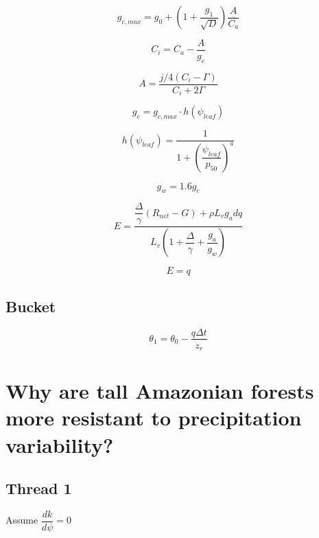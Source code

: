 \documentclass[11pt]{article}
\begin{document}
\begin{equation}
g_{c,max} = g_0 + \left(1+\dfrac{g_1}{\sqrt{D}}\right)\dfrac{A}{C_a}
\end{equation}

\begin{equation}
C_i = C_a - \dfrac{A}{g_c}
\end{equation}

\begin{equation}
A = \dfrac{j/4\left(C_i-\Gamma\right)}{C_i+2\Gamma}
\end{equation}

\begin{equation}
g_c = g_{c,max}\cdot h\left(\psi_{leaf}\right)
\end{equation}

\begin{equation}
h\left(\psi_{leaf}\right) = 
\dfrac{1}{
1+\left(\dfrac{\psi_{leaf}}{p_{50}}\right)^a
}
\end{equation}


\begin{equation}
g_w = 1.6g_c
\end{equation}

\begin{equation}
E = \dfrac{\dfrac{\Delta}{\gamma}\left(R_{net}-G\right)+\rho L_v g_a dq}
{L_v\left(1+\dfrac{\Delta}{\gamma}+\dfrac{g_a}{g_w}\right)}
\end{equation}

\begin{equation}
E = q
\end{equation}

\subsection{Bucket}

\begin{equation}
\theta_1 = \theta_0 - \dfrac{q\Delta t}{z_r}
\end{equation}


\newpage
\section{Why are tall Amazonian forests more resistant to precipitation variability?}

\subsection{Thread 1}

Assume $\dfrac{dk}{d\psi}=0$
\end{document}
